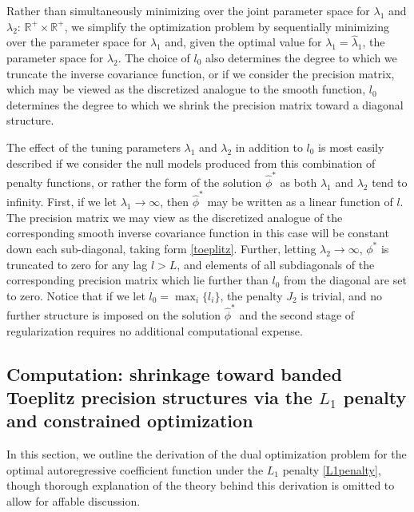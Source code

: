 \documentclass[12pt]{article}
\theoremstyle{definition}
\begin{document}
Rather than simultaneously minimizing over the joint parameter space for $\lambda_1$ and $\lambda_2$: $\mathbb{R}^+\times\mathbb{R}^+$, we simplify the optimization problem by sequentially minimizing over the parameter space for $\lambda_1$ and,  given the optimal value for $\lambda_1= \hat{\lambda}_1$, the parameter space for $\lambda_2$. The choice of $l_0$ also determines the degree to which we truncate the inverse covariance function, or if we consider the precision matrix, which may be viewed as the discretized analogue to the smooth function, $l_0$ determines the degree to which we shrink the precision matrix toward a diagonal structure.

The effect of the tuning parameters $\lambda_1$ and $\lambda_2$ in addition to $l_0$ is most easily described if we consider the null models produced from this combination of penalty functions, or rather the form of the solution $\hat{\phi}^*$ as both $\lambda_1$ and $\lambda_2$ tend to infinity. First, if we let $\lambda_1 \rightarrow \infty$, then $\hat{\phi}^*$ may be written as a linear function of $l$. The precision matrix we may view as the discretized analogue of the corresponding smooth inverse covariance function in this case will be constant down each sub-diagonal, taking form \eqref{toeplitz}. Further, letting $\lambda_2 \rightarrow \infty$, $\phi^*$ is truncated to zero for any lag $l>L$, and elements of all subdiagonals of the corresponding precision matrix which lie further than $l_0$ from the diagonal are set to zero. Notice that if we let $l_0 = \mathop{\max}_{i} \lbrace l_i \rbrace$, the penalty $J_2$ is trivial, and no further structure is imposed on the solution $\hat{\phi}^*$ and the second stage of regularization requires no additional computational expense. 








\subsection{Computation: shrinkage toward banded Toeplitz precision structures via the $L_1$ penalty and constrained optimization }

In this section, we outline the derivation of the dual optimization problem for the optimal autoregressive coefficient function under the $L_1$ penalty \eqref{L1penalty}, though thorough explanation of the theory behind this derivation is omitted to allow for affable discussion.
\end{document}
